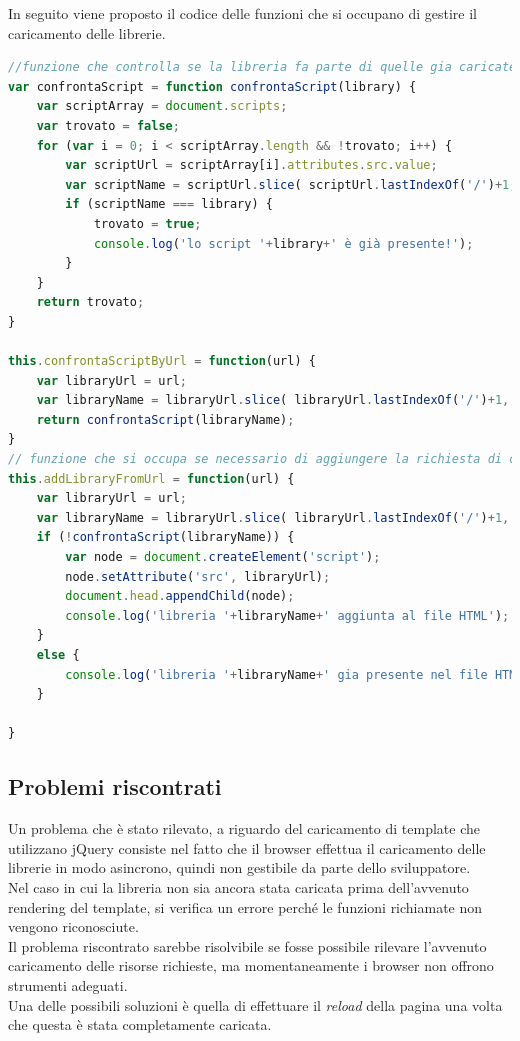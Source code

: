 In seguito viene proposto il codice delle funzioni che si occupano di gestire il caricamento delle librerie.
\begin{lstlisting}[language=JavaScript, caption=Funzioni che si occupano del caricamento delle librerie]
//funzione che controlla se la libreria fa parte di quelle gia caricate
var confrontaScript = function confrontaScript(library) {
	var scriptArray = document.scripts;
	var trovato = false;
	for (var i = 0; i < scriptArray.length && !trovato; i++) {
		var scriptUrl = scriptArray[i].attributes.src.value;
		var scriptName = scriptUrl.slice( scriptUrl.lastIndexOf('/')+1, scriptUrl.length);
		if (scriptName === library) {
			trovato = true;
			console.log('lo script '+library+' è già presente!');
		}
	}
	return trovato;
}

this.confrontaScriptByUrl = function(url) {
	var libraryUrl = url;
	var libraryName = libraryUrl.slice( libraryUrl.lastIndexOf('/')+1, libraryUrl.length );
	return confrontaScript(libraryName);
}
// funzione che si occupa se necessario di aggiungere la richiesta di caricamento alla pagina
this.addLibraryFromUrl = function(url) {
	var libraryUrl = url;
	var libraryName = libraryUrl.slice( libraryUrl.lastIndexOf('/')+1, libraryUrl.length );
	if (!confrontaScript(libraryName)) {
		var node = document.createElement('script');
		node.setAttribute('src', libraryUrl);
		document.head.appendChild(node);
		console.log('libreria '+libraryName+' aggiunta al file HTML');
	}
	else {
		console.log('libreria '+libraryName+' gia presente nel file HTML');
	}

}
\end{lstlisting}

\subsection{Problemi riscontrati} \label{subsec: problemi_lib}
Un problema che è stato rilevato, a riguardo del caricamento di template che utilizzano jQuery consiste nel fatto che il browser effettua il caricamento delle librerie in modo asincrono, quindi non gestibile da parte dello sviluppatore.\\
Nel caso in cui la libreria non sia ancora stata caricata prima dell'avvenuto rendering del template, si verifica un errore perché le funzioni richiamate non vengono riconosciute.\\
Il problema riscontrato sarebbe risolvibile se fosse possibile rilevare l'avvenuto caricamento delle risorse richieste, ma momentaneamente i browser non offrono strumenti adeguati.\\
Una delle possibili soluzioni è quella di effettuare il \textit{reload} della pagina una volta che questa è stata completamente caricata.





